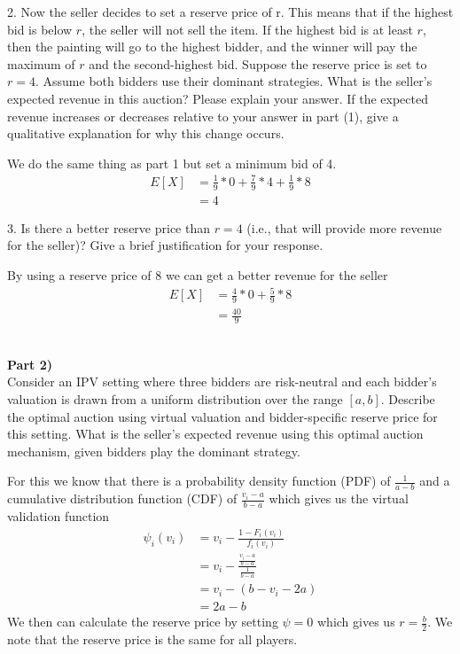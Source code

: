 \documentclass[12pt,letter]{article}
\newcommand{\ppart}[1]{\vspace{2mm}\large\textbf{\\Part {#1})\vspace{2mm}}\normalsize\\}
\begin{document}
2. Now the seller decides to set a reserve price of r. This means that if the highest bid is below
$r$, the seller will not sell the item. If the highest bid is at least $r$, then the painting will go
to the highest bidder, and the winner will pay the maximum of $r$ and the second-highest bid.
Suppose the reserve price is set to $r=4$. Assume both bidders use their dominant strategies.
What is the seller’s expected revenue in this auction? Please explain your answer. If the
expected revenue increases or decreases relative to your answer in part (1), give a qualitative
explanation for why this change occurs.

We do the same thing as part 1 but set a minimum bid of 4.
\begin{align*}
    E[X] &= \frac19*0 + \frac79*4 + \frac19*8\\
    &= 4
\end{align*}

3. Is there a better reserve price than $r=4$ (i.e., that will provide more revenue for the seller)?
Give a brief justification for your response.

By using a reserve price of 8 we can get a better revenue for the seller
\begin{align*}
    E[X] &= \frac49*0 + \frac59*8\\
    &= \frac{40}{9}
\end{align*}


\ppart{2}
Consider an IPV setting where three bidders are risk-neutral and each
bidder’s valuation is drawn from a uniform distribution over the range $[a, b]$. Describe the optimal
auction using virtual valuation and bidder-specific reserve price for this setting. What is the seller’s
expected revenue using this optimal auction mechanism, given bidders play the dominant strategy.

For this we know that there is a probability density function (PDF) of
$\frac{1}{a-b}$ and a cumulative distribution function (CDF) of $\frac{v_i - a}{b-a}$
which gives us the virtual validation function
\begin{align*}
    \psi_i(v_i) &= v_i - \frac{1-F_i(v_i)}{f_i(v_i)}\\
    &= v_i - \frac{\frac{v_i-a}{b-a}}{\frac{1}{b-a}}\\
    &= v_i - (b-v_i-2a)\\
    &= 2a-b
\end{align*}
We then can calculate the reserve price by setting $\psi=0$ which gives us
$r=\frac{b}{2}$. We note that the reserve price is the same for all players.
\end{document}
